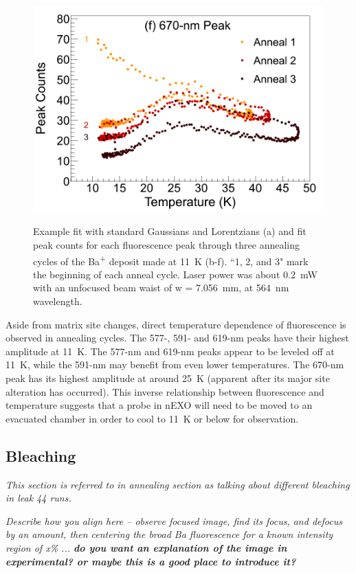 \begin{figure}
                ~
                \includegraphics[width=.5\textwidth]{figures/anneal_670peak.png}
                \caption{Example fit with standard Gaussians and Lorentzians (a) and fit peak counts for each fluorescence peak through three annealing cycles of the Ba\textsuperscript{+} deposit made at 11~K (b-f).  ``1, 2, and 3" mark the beginning of each anneal cycle.  Laser power was about 0.2~mW with an unfocused beam waist of w = 7.056~mm, at 564~nm wavelength.}
\label{fig:annealGrn}
\end{figure}

Aside from matrix site changes, direct temperature dependence of fluorescence is observed in annealing cycles.  The 577-, 591- and 619-nm peaks have their highest amplitude at 11~K.  The 577-nm and 619-nm peaks appear to be leveled off at 11~K, while the 591-nm may benefit from even lower temperatures.  The 670-nm peak has its highest amplitude at around 25~K (apparent after its major site alteration has occurred).  This inverse relationship between fluorescence and temperature suggests that a probe in nEXO will need to be moved to an evacuated chamber in order to cool to 11~K or below for observation.  



\subsection{Bleaching}
\label{subsec:bleaching}

\emph{\color{gray}This section is referred to in annealing section as talking about different bleaching in leak 44 runs.}

\emph{\color{gray}Describe how you align here -- observe focused image, find its focus, and defocus by an amount, then centering the broad Ba fluorescence for a known intensity region of x\% ... \textbf{do you want an explanation of the image in experimental?  or maybe this is a good place to introduce it?}}

